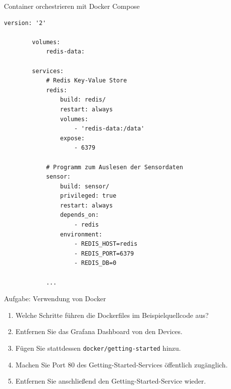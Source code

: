 {
\scriptsize

\begin{frame}[fragile]{Container orchestrieren mit Docker Compose}

    \begin{lstlisting}[language={}, gobble=8, basicstyle=\tiny\ttfamily]
        version: '2'

        volumes:
            redis-data:

        services:
            # Redis Key-Value Store
            redis:
                build: redis/
                restart: always
                volumes:
                    - 'redis-data:/data'
                expose:
                    - 6379

            # Programm zum Auslesen der Sensordaten
            sensor:
                build: sensor/
                privileged: true
                restart: always
                depends_on:
                    - redis
                environment:
                    - REDIS_HOST=redis
                    - REDIS_PORT=6379
                    - REDIS_DB=0

            ...
    \end{lstlisting}
\end{frame}
}

{
\small

\begin{frame}{Aufgabe: Verwendung von Docker}
    \begin{enumerate}
        \item Welche Schritte führen die Dockerfiles im Beispielquellcode aus?
        \item Entfernen Sie das Grafana Dashboard von den Devices.
        \item Fügen Sie stattdessen \texttt{docker/getting-started} hinzu.
        \item Machen Sie Port 80 des Getting-Started-Services öffentlich zugänglich.
        \item Entfernen Sie anschließend den Getting-Started-Service wieder.
    \end{enumerate}
\end{frame}
}

